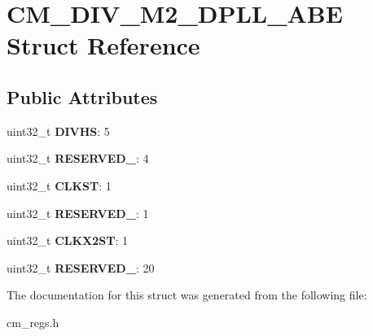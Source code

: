 \hypertarget{structCM__DIV__M2__DPLL__ABE}{\section{C\-M\-\_\-\-D\-I\-V\-\_\-\-M2\-\_\-\-D\-P\-L\-L\-\_\-\-A\-B\-E Struct Reference}
\label{structCM__DIV__M2__DPLL__ABE}
}
\subsection*{Public Attributes}
\begin{DoxyCompactItemize}
\item 
\hypertarget{structCM__DIV__M2__DPLL__ABE_ab4996881473ed410be65cfffb5435338}{uint32\-\_\-t {\bfseries D\-I\-V\-H\-S}\-: 5}\label{structCM__DIV__M2__DPLL__ABE_ab4996881473ed410be65cfffb5435338}

\item 
\hypertarget{structCM__DIV__M2__DPLL__ABE_af5d49eb0874a45c5f86b8e3bbf1d280f}{uint32\-\_\-t {\bfseries R\-E\-S\-E\-R\-V\-E\-D\-\_}\-: 4}\label{structCM__DIV__M2__DPLL__ABE_af5d49eb0874a45c5f86b8e3bbf1d280f}

\item 
\hypertarget{structCM__DIV__M2__DPLL__ABE_aa35c7d9d1ba7b738d3368417e32dda82}{uint32\-\_\-t {\bfseries C\-L\-K\-S\-T}\-: 1}\label{structCM__DIV__M2__DPLL__ABE_aa35c7d9d1ba7b738d3368417e32dda82}

\item 
\hypertarget{structCM__DIV__M2__DPLL__ABE_ad9ecc0f1677001259a67c6bef8f30b3c}{uint32\-\_\-t {\bfseries R\-E\-S\-E\-R\-V\-E\-D\-\_}\-: 1}\label{structCM__DIV__M2__DPLL__ABE_ad9ecc0f1677001259a67c6bef8f30b3c}

\item 
\hypertarget{structCM__DIV__M2__DPLL__ABE_a9624b4fe2e0f446dbd6e4ac4e22849cc}{uint32\-\_\-t {\bfseries C\-L\-K\-X2\-S\-T}\-: 1}\label{structCM__DIV__M2__DPLL__ABE_a9624b4fe2e0f446dbd6e4ac4e22849cc}

\item 
\hypertarget{structCM__DIV__M2__DPLL__ABE_a67b826aecb6625e6814dbadb7d29c0db}{uint32\-\_\-t {\bfseries R\-E\-S\-E\-R\-V\-E\-D\-\_}\-: 20}\label{structCM__DIV__M2__DPLL__ABE_a67b826aecb6625e6814dbadb7d29c0db}

\end{DoxyCompactItemize}


The documentation for this struct was generated from the following file\-:\begin{DoxyCompactItemize}
\item 
cm\-\_\-regs.\-h\end{DoxyCompactItemize}
